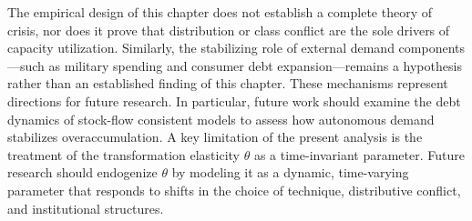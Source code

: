 \documentclass[11pt]{article}
\begin{document}
The empirical design of this chapter does not establish a complete theory of crisis, nor does it prove that distribution or class conflict are the sole drivers of capacity utilization. Similarly, the stabilizing role of external demand components—such as military spending and consumer debt expansion—remains a hypothesis rather than an established finding of this chapter. These mechanisms represent directions for future research. In particular, future work should examine the debt dynamics of stock-flow consistent models to assess how autonomous demand stabilizes overaccumulation. A key limitation of the present analysis is the treatment of the transformation elasticity $\theta$ as a time-invariant parameter. Future research should endogenize $\theta$ by modeling it as a dynamic, time-varying parameter that responds to shifts in the choice of technique, distributive conflict, and institutional structures.

\pagebreak


\pagebreak
\appendix

\pagebreak

\end{document}

